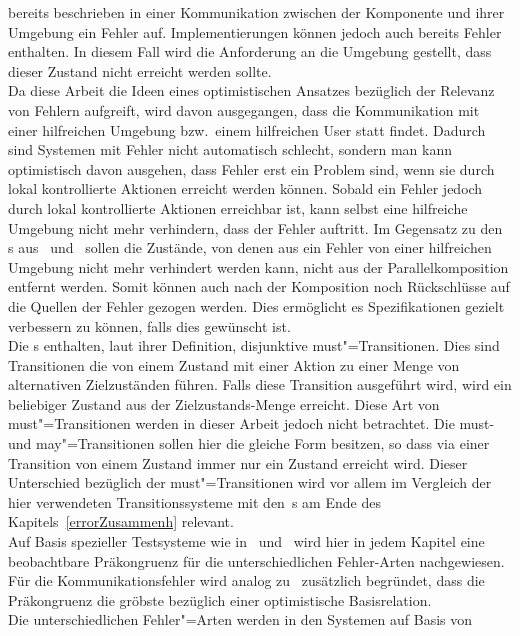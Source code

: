 bereits beschrieben in einer Kommunikation zwischen der Komponente und ihrer
Umgebung ein Fehler auf. Implementierungen können jedoch auch bereits Fehler
enthalten. In diesem Fall wird die Anforderung an die Umgebung gestellt, dass
dieser Zustand nicht erreicht werden sollte.\\
Da diese Arbeit die Ideen eines optimistischen Ansatzes bezüglich der Relevanz
von Fehlern aufgreift, wird davon ausgegangen, dass die Kommunikation
mit einer hilfreichen Umgebung bzw.\ einem hilfreichen User statt findet.
Dadurch sind Systemen mit Fehler nicht automatisch schlecht, sondern man kann
optimistisch davon ausgehen, dass Fehler erst ein Problem sind, wenn sie durch
lokal kontrollierte Aktionen erreicht werden können. Sobald ein Fehler jedoch
durch lokal kontrollierte Aktionen erreichbar ist, kann
selbst eine hilfreiche Umgebung nicht mehr verhindern, dass der Fehler
auftritt. Im Gegensatz zu den \MIA{}s aus~\cite{Luttgen2013MIA1}
und~\cite{Vogler2016MIA3} sollen die Zustände, von denen aus ein Fehler von
einer hilfreichen Umgebung nicht mehr verhindert werden kann, nicht aus der
Parallelkomposition entfernt werden. Somit können auch nach der Komposition
noch Rückschlüsse auf die Quellen der Fehler gezogen werden. Dies ermöglicht
es Spezifikationen gezielt verbessern zu können, falls dies gewünscht ist.\\
Die \MIA{}s enthalten, laut ihrer Definition, disjunktive must"=Transitionen.
Dies sind Transitionen die von einem Zustand mit einer Aktion zu einer Menge
von alternativen Zielzuständen führen. Falls diese Transition ausgeführt wird,
wird ein beliebiger Zustand aus der Zielzustands-Menge erreicht. Diese Art von
must"=Transitionen werden in dieser Arbeit jedoch nicht betrachtet. Die must-
und may"=Transitionen sollen hier die gleiche Form besitzen, so dass via einer
Transition von einem Zustand immer nur ein Zustand erreicht wird. Dieser
Unterschied bezüglich der must"=Transitionen wird vor allem im Vergleich der
hier verwendeten Transitionssysteme mit den~\MIA{}s am Ende des
Kapitels~\ref{errorZusammenh} relevant.\\
Auf Basis spezieller Testsysteme wie in~\cite{Vogler2015FailSem}
und~\cite{Vogler2017dMTS} wird hier in jedem Kapitel eine beobachtbare
Präkongruenz für die unterschiedlichen Fehler-Arten nachgewiesen. Für die
Kommunikationsfehler wird analog zu~\cite{Schinko2016BA} zusätzlich begründet,
dass die Präkongruenz die gröbste bezüglich einer optimistische
Basisrelation.\\
Die unterschiedlichen Fehler"=Arten werden in den Systemen auf Basis von
